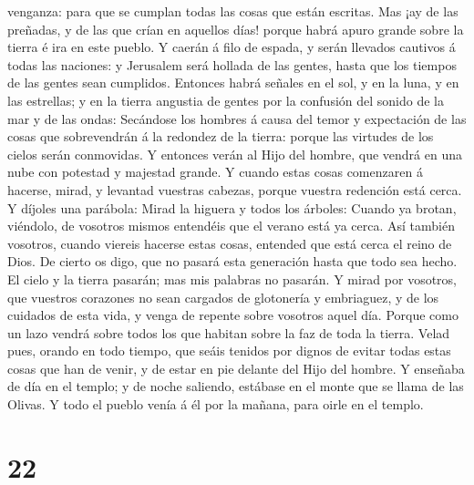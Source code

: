 venganza: para que se cumplan todas las cosas que están escritas.
 Mas ¡ay de las preñadas, y de las que crían en aquellos
días! porque habrá apuro grande sobre la tierra é ira en este pueblo.
 Y caerán á filo de espada, y serán llevados cautivos á
todas las naciones: y Jerusalem será hollada de las gentes, hasta que
los tiempos de las gentes sean cumplidos.  Entonces habrá
señales en el sol, y en la luna, y en las estrellas; y en la tierra
angustia de gentes por la confusión del sonido de la mar y de las ondas:
 Secándose los hombres á causa del temor y expectación de
las cosas que sobrevendrán á la redondez de la tierra: porque las
virtudes de los cielos serán conmovidas.  Y entonces
verán al Hijo del hombre, que vendrá en una nube con potestad y majestad
grande.  Y cuando estas cosas comenzaren á hacerse,
mirad, y levantad vuestras cabezas, porque vuestra redención está cerca.
 Y díjoles una parábola: Mirad la higuera y todos los
árboles:  Cuando ya brotan, viéndolo, de vosotros mismos
entendéis que el verano está ya cerca.  Así también
vosotros, cuando viereis hacerse estas cosas, entended que está cerca el
reino de Dios.  De cierto os digo, que no pasará esta
generación hasta que todo sea hecho.  El cielo y la
tierra pasarán; mas mis palabras no pasarán.  Y mirad por
vosotros, que vuestros corazones no sean cargados de glotonería y
embriaguez, y de los cuidados de esta vida, y venga de repente sobre
vosotros aquel día.  Porque como un lazo vendrá sobre
todos los que habitan sobre la faz de toda la tierra. 
Velad pues, orando en todo tiempo, que seáis tenidos por dignos de
evitar todas estas cosas que han de venir, y de estar en pie delante del
Hijo del hombre.  Y enseñaba de día en el templo; y de
noche saliendo, estábase en el monte que se llama de las Olivas.
 Y todo el pueblo venía á él por la mañana, para oirle en
el templo.

\hypertarget{section-21}{%
\section{22}\label{section-21}}

